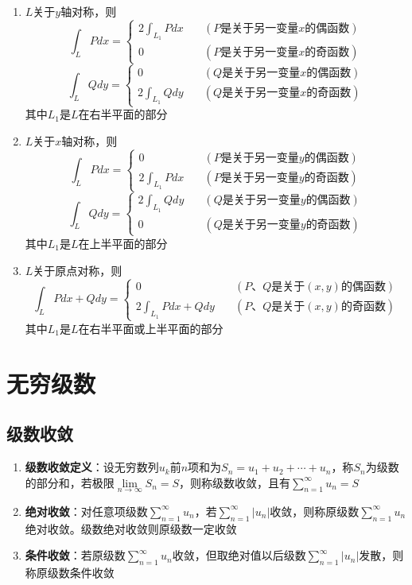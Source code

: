 \documentclass[12pt,a4paper,UTF8]{book}
\begin{document}
\begin{enumerate}
\begin{enumerate}
\item $L$关于$y$轴对称，则
\[\int_{L}Pdx=\left\{\begin{aligned}
2\int_{L_1}Pdx\quad&\left(P\text{是关于另一变量}x\text{的偶函数}\right)\\
0\qquad&\left(P\text{是关于另一变量}x\text{的奇函数}\right)
\end{aligned}\right.\]
\[\int_{L}Qdy=\left\{\begin{aligned}
0\qquad&\left(Q\text{是关于另一变量}x\text{的偶函数}\right)\\
2\int_{L_1}Qdy\quad&\left(Q\text{是关于另一变量}x\text{的奇函数}\right)
\end{aligned}\right.\]
其中$L_1$是$L$在右半平面的部分
\item $L$关于$x$轴对称，则
\[\int_{L}Pdx=\left\{\begin{aligned}
0\qquad&\left(P\text{是关于另一变量}y\text{的偶函数}\right)\\
2\int_{L_1}Pdx\quad&\left(P\text{是关于另一变量}y\text{的奇函数}\right)
\end{aligned}\right.\]
\[\int_{L}Qdy=\left\{\begin{aligned}
2\int_{L_1}Qdy\quad&\left(Q\text{是关于另一变量}y\text{的偶函数}\right)\\
0\qquad&\left(Q\text{是关于另一变量}y\text{的奇函数}\right)
\end{aligned}\right.\]
其中$L_1$是$L$在上半平面的部分
\item $L$关于原点对称，则
\[\int_{L}Pdx+Qdy=\left\{\begin{aligned}
0\qquad&\left(P\text{、}Q\text{是关于}\left(x,y\right)\text{的偶函数}\right)\\
2\int_{L_1}Pdx+Qdy\quad&\left(P\text{、}Q\text{是关于}\left(x,y\right)\text{的奇函数}\right)
\end{aligned}\right.\]
其中$L_1$是$L$在右半平面或上半平面的部分
\end{enumerate}
\end{enumerate}


\section{无穷级数}
\subsection{级数收敛}
\begin{enumerate}
\item \textbf{级数收敛定义}：设无穷数列$u_{k}$前$n$项和为$S_n=u_1+u_2+\cdots+u_n$，称$S_n$为级数的部分和，若极限$\lim\limits_{n\to\infty}S_n=S$，则称级数收敛，且有$\sum\limits_{n=1}^{\infty}u_n=S$
\item \textbf{绝对收敛}：对任意项级数$\sum\limits_{n=1}^{\infty}u_n$，若$\sum\limits_{n=1}^{\infty}\left|u_n\right|$收敛，则称原级数$\sum\limits_{n=1}^{\infty}u_n$绝对收敛。级数绝对收敛则原级数一定收敛
\item \textbf{条件收敛}：若原级数$\sum\limits_{n=1}^{\infty}u_n$收敛，但取绝对值以后级数$\sum\limits_{n=1}^{\infty}\left|u_n\right|$发散，则称原级数条件收敛
\end{enumerate}
\end{document}
